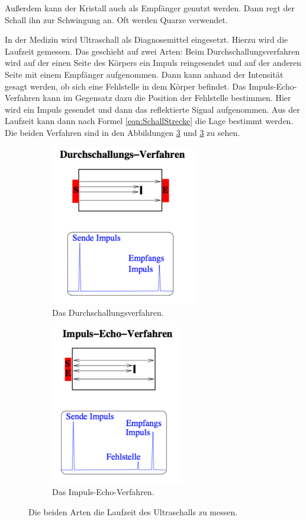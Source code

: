 Außerdem kann der Kristall auch als Empfänger genutzt werden. Dann regt der Schall ihn zur Schwingung an.
Oft werden Quarze verwendet.

In der Medizin wird Ultraschall als Diagnosemittel eingesetzt. Hierzu wird die Laufzeit gemessen.
Das geschieht auf zwei Arten:
Beim Durchschallungsverfahren wird auf der einen Seite des Körpers ein Impuls reingesendet
und auf der anderen Seite mit einem Empfänger aufgenommen. Dann kann anhand der Intensität
gesagt werden, ob sich eine Fehlstelle in dem Körper befindet.
Das Impuls-Echo-Verfahren kann im Gegensatz dazu die Position der Fehlstelle bestimmen.
Hier wird ein Impuls gesendet und dann das reflektierte Signal aufgenommen. Aus
der Laufzeit kann dann nach Formel \eqref{eqn:SchallStrecke} die Lage bestimmt werden.
Die beiden Verfahren sind in den Abbildungen \ref{fig:verfahren}
und \ref{fig:verfahren} zu sehen.

\begin{figure}
  \centering
  \begin{subfigure}{0.48\textwidth}
    \centering
    \includegraphics[height=7cm]{Pics/durchschall.pdf}
    \caption{Das Durchschallungsverfahren.\cite{anleitung}}
    \label{fig:durchschall}
  \end{subfigure}
  \begin{subfigure}{0.48\textwidth}
    \centering
    \includegraphics[height=7cm]{Pics/Impuls-Echo.pdf}
    \caption{Das Impuls-Echo-Verfahren.\cite{anleitung}}
    \label{fig:impuls_echo}
  \end{subfigure}
  \caption{Die beiden Arten die Laufzeit des Ultraschalls zu messen.}
  \label{fig:verfahren}
\end{figure}

